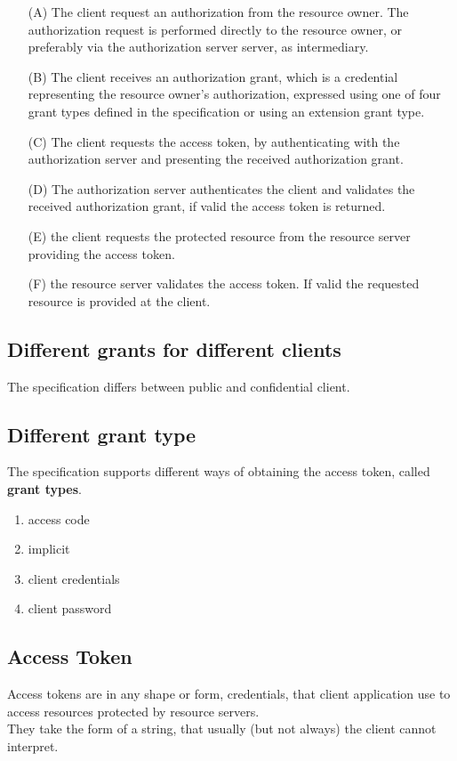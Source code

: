  \begin{itemize}
     \item[(A)] The client request an authorization from the resource owner.
         The authorization request is performed directly to the resource owner,
         or preferably via the authorization server server, as intermediary.
     \item[(B)] The client receives an authorization grant, which is a
         credential representing the resource owner's authorization, expressed
         using one of four grant types defined in the specification or using an
         extension grant type.
     \item[(C)] The client requests the access token, by authenticating with the
         authorization server and presenting the received authorization grant.
     \item[(D)] The authorization server authenticates the client and validates
         the received authorization grant, if valid the access token is
         returned.
     \item[(E)] the client requests the protected resource from the resource
         server providing the access token.
     \item[(F)] the resource server validates the access token. If valid the
         requested resource is provided at the client.
 \end{itemize}

\subsection{Different grants for different clients}
The specification differs between public and confidential client.

\subsection{Different grant type}
The specification supports different ways of obtaining the access token, called
\textbf{grant types}.
\begin{enumerate}
    \item access code
    \item implicit
    \item client credentials
    \item client password
\end{enumerate}

\subsection{Access Token}
Access tokens are in any shape or form, credentials, that client application use
to access resources protected by resource servers.
\\
They take the form of a string, that usually (but not always) the client cannot
interpret.


